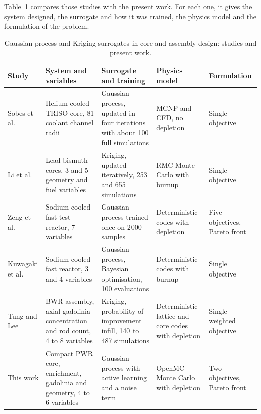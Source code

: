 Table~\ref{tab:lit-gp-core} compares those studies with the present
work. For each one, it gives the system designed, the surrogate and how it
was trained, the physics model and the formulation of the problem.

\begin{table}[htbp]
  \centering
  \caption{Gaussian process and Kriging surrogates in core and assembly design: studies and present work.}
  \label{tab:lit-gp-core}
  \footnotesize
  \begin{tabular}{@{}>{\raggedright\arraybackslash}p{}>{\raggedright\arraybackslash}p{}%
                  >{\raggedright\arraybackslash}p{}>{\raggedright\arraybackslash}p{}%
                  >{\raggedright\arraybackslash}p{}@{}}
    \toprule
    Study & System and variables & Surrogate and training & Physics model & Formulation \\
    \midrule
    Sobes et al.~\cite{sobes_2021_ai_core} &
    Helium-cooled TRISO core, 81 coolant channel radii &
    Gaussian process, updated in four iterations with about 100 full simulations &
    MCNP and CFD, no depletion &
    Single objective \\
    \addlinespace
    Li et al.~\cite{li_2022_kriging_lbe} &
    Lead-bismuth cores, 3 and 5 geometry and fuel variables &
    Kriging, updated iteratively, 253 and 655 simulations &
    RMC Monte Carlo with burnup &
    Single objective \\
    \addlinespace
    Zeng et al.~\cite{zeng_2020_sfr_opt} &
    Sodium-cooled fast test reactor, 7 variables &
    Gaussian process trained once on 2000 samples &
    Deterministic codes with depletion &
    Five objectives, Pareto front \\
    \addlinespace
    Kuwagaki et al.~\cite{kuwagaki_2026_bo_sfr} &
    Sodium-cooled fast reactor, 3 and 4 variables &
    Gaussian process, Bayesian optimisation, 100 evaluations &
    Deterministic codes with burnup &
    Single objective \\
    \addlinespace
    Tung and Lee~\cite{tung_lee_2020_gd_bwr} &
    BWR assembly, axial gadolinia concentration and rod count, 4 to 8 variables &
    Kriging, probability-of-improvement infill, 140 to 487 simulations &
    Deterministic lattice and core codes with depletion &
    Single weighted objective \\
    \addlinespace
    This work &
    Compact PWR core, enrichment, gadolinia and geometry, 4 to 6 variables &
    Gaussian process with active learning and a noise term &
    OpenMC Monte Carlo with depletion &
    Two objectives, Pareto front \\
    \bottomrule
  \end{tabular}
\end{table}

